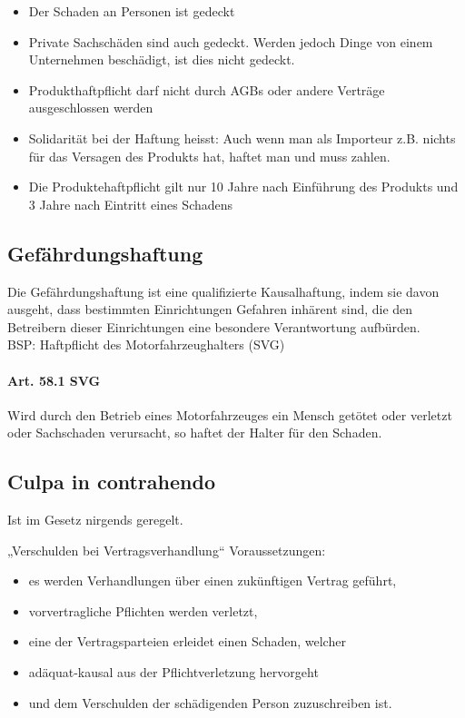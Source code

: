 \begin{itemize}
	\tightlist
	\item Der Schaden an Personen ist gedeckt
	\item Private Sachschäden sind auch gedeckt. Werden jedoch Dinge von einem
	Unternehmen beschädigt, ist dies nicht gedeckt.
	\item Produkthaftpflicht darf nicht durch AGBs oder andere Verträge
	ausgeschlossen werden
	\item Solidarität bei der Haftung heisst: Auch wenn man als Importeur z.B.
	nichts für das Versagen des Produkts hat, haftet man und muss zahlen.
	\item Die Produktehaftpflicht gilt nur 10 Jahre nach Einführung des Produkts
	und 3 Jahre nach Eintritt eines Schadens
\end{itemize}

\subsection{Gefährdungshaftung}

Die Gefährdungshaftung ist eine qualifizierte Kausalhaftung, indem sie
davon ausgeht, dass bestimmten Einrichtungen Gefahren inhärent sind, die
den Betreibern dieser Einrichtungen eine besondere Verantwortung
aufbürden.\\
BSP: Haftpflicht des Motorfahrzeughalters (SVG)

\paragraph{Art. 58.1 SVG}
Wird durch den Betrieb eines Motorfahrzeuges ein Mensch getötet oder
verletzt oder Sachschaden verursacht, so haftet der Halter für den
Schaden.


\subsection{Culpa in contrahendo}

Ist im Gesetz nirgends geregelt.

„Verschulden bei Vertragsverhandlung`` Voraussetzungen:

\begin{itemize}
	\tightlist
	\item es werden Verhandlungen über einen zukünftigen Vertrag geführt,
	\item vorvertragliche Pflichten werden verletzt,
	\item eine der Vertragsparteien erleidet einen Schaden, welcher
	\item adäquat-kausal aus der Pflichtverletzung hervorgeht
	\item und dem Verschulden der schädigenden Person zuzuschreiben ist.
\end{itemize}
